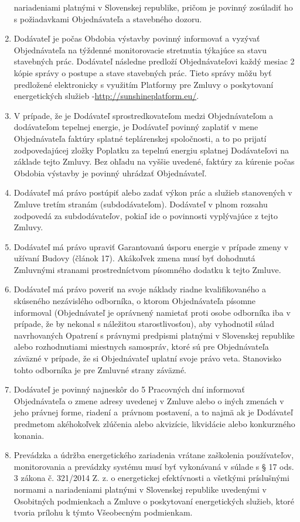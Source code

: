 \begin{multicols}{2}
\begin{enumerate}
  nariadeniami platnými v Slovenskej republike, pričom je povinný
  zosúladiť ho s požiadavkami Objednávateľa a stavebného dozoru.
\item
  Dodávateľ je počas Obdobia výstavby povinný informovať a vyzývať
  Objednávateľa na týždenné monitorovacie stretnutia týkajúce sa stavu
  stavebných prác. Dodávateľ následne predloží Objednávateľovi každý
  mesiac 2 kópie správy o postupe a stave stavebných prác. Tieto správy
  môžu byť predložené elektronicky s využitím Platformy pre Zmluvy o
  poskytovaní energetických služieb
  -\href{http://www.sharex.lv}{http://sunshineplatform.eu/}.
\item
  V prípade, že je Dodávateľ sprostredkovateľom medzi Objednávateľom a
  dodávateľom tepelnej energie, je Dodávateľ povinný zaplatiť v mene
  Objednávateľa faktúry splatné teplárenskej spoločnosti, a to po
  prijatí zodpovedajúcej zložky Poplatku za tepelnú energiu splatnej
  Dodávateľovi na základe tejto Zmluvy. Bez ohľadu na vyššie uvedené,
  faktúry za kúrenie počas Obdobia výstavby je povinný uhrádzať
  Objednávateľ.
\item
  Dodávateľ má právo postúpiť alebo zadať výkon prác a služieb
  stanovených v Zmluve tretím stranám (subdodávateľom). Dodávateľ v
  plnom rozsahu zodpovedá za subdodávateľov, pokiaľ ide o povinnosti
  vyplývajúce z tejto Zmluvy.
\item
  Dodávateľ má právo upraviť Garantovanú úsporu energie v prípade zmeny
  v užívaní Budovy (článok 17). Akákoľvek zmena musí byť dohodnutá
  Zmluvnými stranami prostredníctvom písomného dodatku k tejto Zmluve.
\item
  Dodávateľ má právo poveriť na svoje náklady riadne kvalifikovaného a
  skúseného nezávislého odborníka, o ktorom Objednávateľa písomne
  informoval (Objednávateľ je oprávnený namietať proti osobe odborníka
  iba v prípade, že by nekonal s náležitou starostlivosťou), aby
  vyhodnotil súlad navrhovaných Opatrení s právnymi predpismi platnými v
  Slovenskej republike alebo rozhodnutiami miestnych samospráv, ktoré sú
  pre Objednávateľa záväzné v prípade, že si Objednávateľ uplatní svoje
  právo veta. Stanovisko tohto odborníka je pre Zmluvné strany záväzné.
\item
  Dodávateľ je povinný najneskôr do 5 Pracovných dní informovať
  Objednávateľa o zmene adresy uvedenej v Zmluve alebo o iných zmenách v
  jeho právnej forme, riadení a~právnom postavení, a to najmä ak je
  Dodávateľ predmetom akéhokoľvek zlúčenia alebo akvizície, likvidácie
  alebo konkurzného konania.
\item
  Prevádzka a údržba energetického zariadenia vrátane zaškolenia
  používateľov, monitorovania a prevádzky systému musí byť vykonávaná v
  súlade s § 17 ods. 3 zákona č. 321/2014 Z. z. o energetickej
  efektívnosti a všetkými príslušnými normami a nariadeniami platnými v
  Slovenskej republike uvedenými v Osobitných podmienkach a Zmluve o
  poskytovaní energetických služieb, ktoré tvoria prílohu k týmto
  Všeobecným podmienkam.
\end{enumerate}


\end{multicols}
